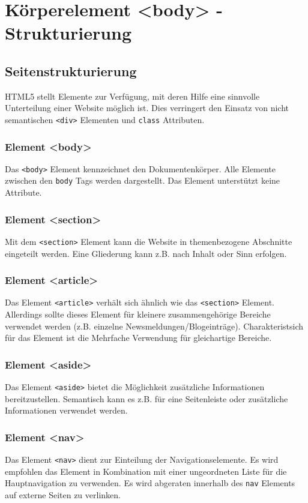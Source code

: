 \chapter{Körperelement <body> - Strukturierung} 
\section{Seitenstrukturierung}
HTML5 stellt Elemente zur Verfügung, mit deren Hilfe eine sinnvolle Unterteilung einer Website möglich ist. Dies verringert den Einsatz von nicht semantischen \texttt{<div>} Elementen und \texttt{class} Attributen.
\subsection{Element <body>}
Das \texttt{<body>} Element kennzeichnet den Dokumentenkörper. Alle Elemente zwischen den \texttt{body} Tags werden dargestellt. Das Element unterstützt keine Attribute.
\subsection{Element <section>}
Mit dem \texttt{<section>} Element kann die Website in themenbezogene Abschnitte eingeteilt werden. Eine Gliederung kann z.B. nach Inhalt oder Sinn erfolgen.
\subsection{Element <article>}
Das Element \texttt{<article>} verhält sich ähnlich wie das \texttt{<section>} Element. Allerdings sollte dieses Element für kleinere zusammengehörige Bereiche verwendet werden (z.B. einzelne Newsmeldungen/Blogeinträge). Charakteristsich für das Element ist die Mehrfache Verwendung für gleichartige Bereiche.
\subsection{Element <aside>}
Das Element \texttt{<aside>} bietet die Möglichkeit zusätzliche Informationen bereitzustellen. Semantisch kann es z.B. für eine Seitenleiste oder zusätzliche Informationen verwendet werden.
\subsection{Element <nav>}
Das Element \texttt{<nav>} dient zur Einteilung der Navigationselemente. Es wird empfohlen das Element in Kombination mit einer ungeordneten Liste für die Hauptnavigation zu verwenden. Es wird abgeraten innerhalb des \texttt{nav} Elements auf externe Seiten zu verlinken.

